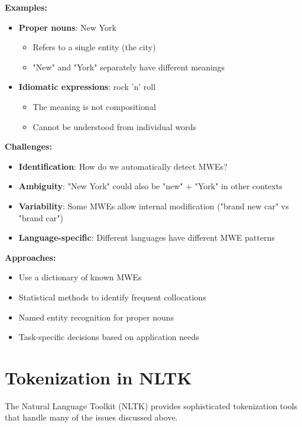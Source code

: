 \documentclass[11pt,a4paper]{article}
\theoremstyle{definition}
\theoremstyle{plain}
\theoremstyle{remark}
\begin{document}
\textbf{Examples:}
\begin{itemize}
    \item \textbf{Proper nouns}: New York
    \begin{itemize}
        \item Refers to a single entity (the city)
        \item "New" and "York" separately have different meanings
    \end{itemize}
    
    \item \textbf{Idiomatic expressions}: rock 'n' roll
    \begin{itemize}
        \item The meaning is not compositional
        \item Cannot be understood from individual words
    \end{itemize}
\end{itemize}

\textbf{Challenges:}
\begin{itemize}
    \item \textbf{Identification}: How do we automatically detect MWEs?
    \item \textbf{Ambiguity}: "New York" could also be "new" + "York" in other contexts
    \item \textbf{Variability}: Some MWEs allow internal modification ("brand new car" vs "brand car")
    \item \textbf{Language-specific}: Different languages have different MWE patterns
\end{itemize}

\textbf{Approaches:}
\begin{itemize}
    \item Use a dictionary of known MWEs
    \item Statistical methods to identify frequent collocations
    \item Named entity recognition for proper nouns
    \item Task-specific decisions based on application needs
\end{itemize}

\section{Tokenization in NLTK}

The Natural Language Toolkit (NLTK) provides sophisticated tokenization tools that handle many of the issues discussed above.
\end{document}
